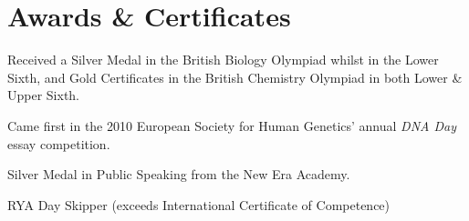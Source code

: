 \documentclass[letterpaper]{article}
\renewenvironment{itemize}{
  \begin{list}{}{
    \setlength{\leftmargin}{1.5em}
  }
}{
  \end{list}
}
\begin{document}
\section*{Awards \& Certificates}
\begin{itemize}
	\item Received a Silver Medal in the British Biology Olympiad whilst in the Lower Sixth, and Gold Certificates in the British Chemistry Olympiad in both Lower \& Upper Sixth. 
	\item Came first in the 2010 European Society for Human Genetics' annual \textit{DNA Day} essay competition. 
 	\item Silver Medal in Public Speaking from the New Era Academy.
	\item RYA Day Skipper (exceeds International Certificate of Competence)
\end{itemize}
\end{document}
